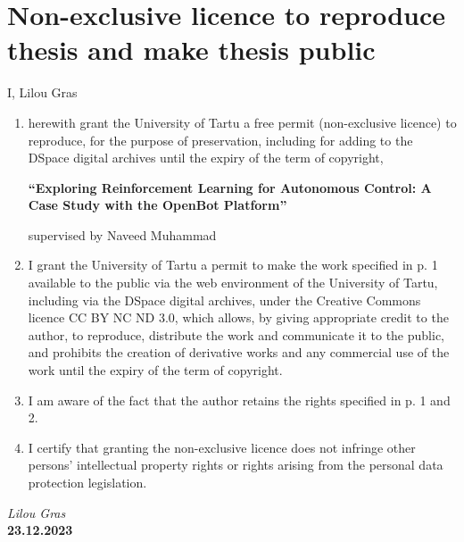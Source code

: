 \documentclass[12pt]{report}
\begin{document}
\chapter*{Non-exclusive licence to reproduce thesis and make thesis public}
\thispagestyle{empty}
I, Lilou Gras
\begin{enumerate}
\item herewith grant the University of Tartu a free permit (non-exclusive licence) to reproduce, for the purpose of preservation, including for adding to the DSpace digital archives until the expiry of the term of copyright,
\begin{center}
\textbf{``Exploring Reinforcement Learning for Autonomous Control: A Case
Study with the OpenBot Platform''}
\end{center}
supervised by Naveed Muhammad
\item I grant the University of Tartu a permit to make the work specified in p. 1 available to the public via the web environment of the University of Tartu, including via the DSpace digital archives, under the Creative Commons licence CC BY NC ND 3.0, which allows, by giving appropriate credit to the author, to reproduce, distribute the work and communicate it to the public, and prohibits the creation of derivative works and any commercial use of the work until the expiry of the term of copyright. 
\item I am aware of the fact that the author retains the rights specified in p. 1 and 2.
\item I certify that granting the non-exclusive licence does not infringe other persons' intellectual property rights or rights arising from the personal data protection legislation.
\end{enumerate}
\vspace{2cm}
\textit{Lilou Gras}
\\
\textbf{23.12.2023}
\end{document}
